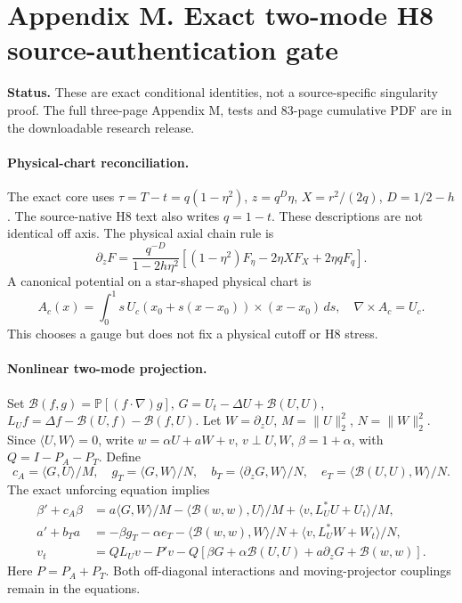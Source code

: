 \clearpage
\section*{Appendix M. Exact two-mode H8 source-authentication gate}
\noindent\textbf{Status.} These are exact conditional identities, not a source-specific singularity proof. The full three-page Appendix M, tests and 83-page cumulative PDF are in the downloadable research release.

\paragraph{Physical-chart reconciliation.}
The exact core uses \(\tau=T-t=q(1-\eta^2)\), \(z=q^D\eta\), \(X=r^2/(2q)\), \(D=1/2-h\). The source-native H8 text also writes \(q=1-t\). These descriptions are not identical off axis. The physical axial chain rule is
\[
\partial_zF=\frac{q^{-D}}{1-2h\eta^2}
\left[(1-\eta^2)F_\eta-2\eta XF_X+2\eta qF_q\right].
\]
A canonical potential on a star-shaped physical chart is
\[
A_c(x)=\int_0^1s\,U_c(x_0+s(x-x_0))\times(x-x_0)\,ds,\quad \nabla\times A_c=U_c.
\]
This chooses a gauge but does not fix a physical cutoff or H8 stress.

\paragraph{Nonlinear two-mode projection.}
Set \(\mathcal B(f,g)=\mathbb P[(f\cdot\nabla)g]\),
\(G=U_t-\Delta U+\mathcal B(U,U)\),
\(L_Uf=\Delta f-\mathcal B(U,f)-\mathcal B(f,U)\).
Let \(W=\partial_zU\), \(M=\|U\|_2^2\), \(N=\|W\|_2^2\).
Since \(\langle U,W\rangle=0\), write
\(w=\alpha U+aW+v\), \(v\perp U,W\), \(\beta=1+\alpha\), with \(Q=I-P_A-P_T\).
Define
\[
c_A=\langle G,U\rangle/M,\quad
g_T=\langle G,W\rangle/N,\quad
b_T=\langle\partial_zG,W\rangle/N,\quad
e_T=\langle\mathcal B(U,U),W\rangle/N.
\]
The exact unforcing equation implies
\begin{align*}
\beta'+c_A\beta&=a\langle G,W\rangle/M
-\langle\mathcal B(w,w),U\rangle/M
+\langle v,L_U^*U+U_t\rangle/M,\\
a'+b_Ta&=-\beta g_T-\alpha e_T
-\langle\mathcal B(w,w),W\rangle/N
+\langle v,L_U^*W+W_t\rangle/N,\\
v_t&=QL_Uv-P'v-Q[\beta G+\alpha\mathcal B(U,U)
+a\partial_zG+\mathcal B(w,w)].
\end{align*}
Here \(P=P_A+P_T\). Both off-diagonal interactions and moving-projector couplings remain in the equations.

